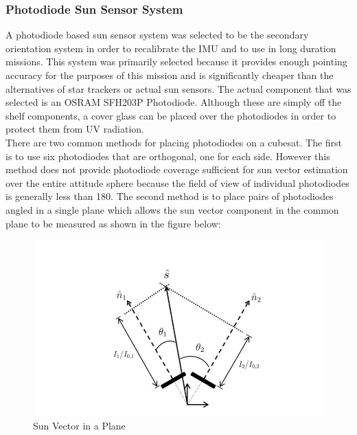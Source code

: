 \subsubsection{Photodiode Sun Sensor System}
A photodiode based sun sensor system was selected to be the secondary orientation system in order to recalibrate the IMU and to use in long duration missions.  This system was primarily selected because it provides enough pointing accuracy for the purposes of this mission and is significantly cheaper than the alternatives of star trackers or actual sun sensors.  The actual component that was selected is an OSRAM SFH203P Photodiode.  Although these are simply off the shelf components, a cover glass can be placed over the photodiodes in order to protect them from UV radiation.\\
There are two common methods for placing photodiodes on a cubesat.  The first is to use six photodiodes that are orthogonal, one for each side. However this method does not provide photodiode coverage sufficient for sun vector estimation over the entire attitude sphere because the field of view of individual photodiodes is generally less than 180\textdegree.  The second method is to place pairs of photodiodes angled in a single plane which allows the sun vector component in the common plane to be measured as shown in the figure below:\\
\vspace{-6mm}
\begin{center}
    \begin{figure}[H]
        \caption{Sun Vector in a Plane \cite{Photo}}
        \vspace{-4mm}
        \centering
        \includegraphics[scale = 0.4]{./figures/Sun_Vector}
    \end{figure}
\end{center}
